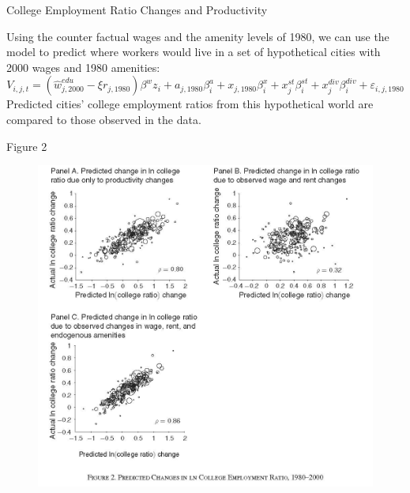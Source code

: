 \documentclass[aspectratio=169]{beamer}
\begin{document}

\begin{frame}{College Employment Ratio Changes and Productivity}

Using the counter factual wages and the amenity levels of 1980, we can use the model to predict where workers would live in a set of hypothetical cities with 2000 wages and 1980 amenities:
\begin{equation*}
    V_{i,j,t} = \left( \hat{w}_{j,2000}^{edu} - \xi r_{j,1980} \right) \beta^{w} z_{i} + a_{j,1980} \beta_{i}^{a} + x_{j,1980} \beta_{i}^{x} + x_{j}^{st}\beta_{i}^{st} + x_{j}^{div} \beta_{i}^{div} + \varepsilon_{i,j,1980}
\end{equation*}
Predicted cities’ college employment ratios from this hypothetical world are compared to those observed in the data. 
    
\end{frame}


\begin{frame}{Figure 2}

\begin{figure}
    \centering
    \includegraphics[scale=0.57]{DiamondFig2.jpg}
    \label{fig:Figure2}
\end{figure}
    
\end{frame}
\end{document}

